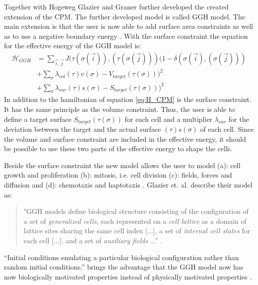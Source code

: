 Together with Hogeweg Glazier and Graner further developed the created extension of the \ac{CPM}. The further developed model is called \ac{GGH} model. The main extension is that the user is now able to add surface area constraints \cite{Graner1992, Glazier1993, Glazier2007} as well as to use a negative boundary energy \cite{Glazier2007}. With the surface constraint the equation for the effective energy of the \ac{GGH} model is: 
\begin{equation}\label{eq:H_GGH}
\begin{split}
\mathcal{H}_{GGH} & = \sum_{\vec{i},\vec{j}}^{ }J(\tau(\sigma(\vec{i})),(\tau(\sigma(\vec{j})))(1-\delta(\sigma(\vec{i}),(\sigma(\vec{j}))) \\
		 & + \sum_{\sigma}^{}{\lambda_{vol}(\tau)v(\sigma)-V_{target}(\tau(\sigma)))^2} \\
		 & + \sum_{\sigma}^{}{\lambda_{sur}(\tau)s(\sigma)-S_{target}(\tau(\sigma)))^2}
\end{split}
\end{equation}
In addition to the hamiltonian of equation \ref{eq:H_CPM} is the surface constraint. It has the same principle as the volume constraint. Thus, the user is able to define a target surface $S_{target}(\tau(\sigma))$ for each cell and a multiplier $\lambda_{sur}$ for the deviation between the target and the actual surface $(\tau)s(\sigma)$ of each cell. Since the volume and surface constraint are included in the effective energy, it should be possible to use these two parts of the effective energy to shape the cells.


Beside the surface constraint the new model allows the user to model (a): cell growth and proliferation (b): mitosis, i.e. cell division (c): fields, forces and diffusion and (d): chemotaxis and haptotaxis \cite{Glazier2007}. \newline
Glazier et. al. describe their model as: 
\begin{quote}
"GGH models define biological structure consisting of the configuration of a set of \textit{generalized cells}, each represented on a \textit{cell lattice} as a domain of lattice sites sharing the same cell index [...], a set of \textit{internal cell states} for each cell [...], and a set of \textit{auxiliary fields} ...” \cite{Glazier2007}.
\end{quote}

“Initial conditions emulating a particular biological configuration rather than random initial conditions.” \cite{Glazier2007} brings the advantage that the \ac{GGH} model now has now biologically motivated properties instead of physically motivated properties \cite{Glazier2007}. 


